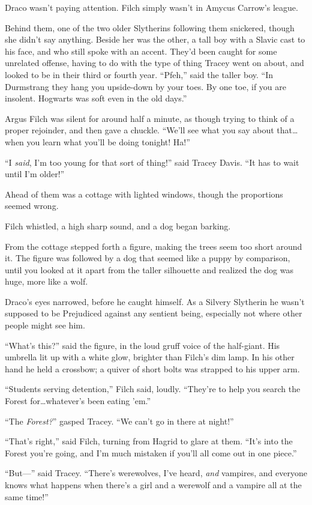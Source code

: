 Draco wasn’t paying attention. Filch simply wasn’t in Amycus Carrow’s league.

Behind them, one of the two older Slytherins following them snickered, though she didn’t say anything. Beside her was the other, a tall boy with a Slavic cast to his face, and who still spoke with an accent. They’d been caught for some unrelated offense, having to do with the type of thing Tracey went on about, and looked to be in their third or fourth year. “Pfeh,” said the taller boy. “In Durmstrang they hang you upside-down by your toes. By one toe, if you are insolent. Hogwarts was soft even in the old days.”

Argus Filch was silent for around half a minute, as though trying to think of a proper rejoinder, and then gave a chuckle. “We’ll see what you say about that…when you learn what you’ll be doing tonight! Ha!”

“I \emph{said}, I’m too young for that sort of thing!” said Tracey Davis. “It has to wait until I’m older!”

Ahead of them was a cottage with lighted windows, though the proportions seemed wrong.

Filch whistled, a high sharp sound, and a dog began barking.

From the cottage stepped forth a figure, making the trees seem too short around it. The figure was followed by a dog that seemed like a puppy by comparison, until you looked at it apart from the taller silhouette and realized the dog was huge, more like a wolf.

Draco’s eyes narrowed, before he caught himself. As a Silvery Slytherin he wasn’t supposed to be Prejudiced against any sentient being, especially not where other people might see him.

“What’s this?” said the figure, in the loud gruff voice of the half-giant. His umbrella lit up with a white glow, brighter than Filch’s dim lamp. In his other hand he held a crossbow; a quiver of short bolts was strapped to his upper arm.

“Students serving detention,” Filch said, loudly. “They’re to help you search the Forest for…whatever’s been eating ’em.”

“The \emph{Forest?}” gasped Tracey. “We can’t go in there at night!”

“That’s right,” said Filch, turning from Hagrid to glare at them. “It’s into the Forest you’re going, and I’m much mistaken if you’ll all come out in one piece.”

“But—” said Tracey. “There’s werewolves, I’ve heard, \emph{and} vampires, and everyone knows what happens when there’s a girl and a werewolf and a vampire all at the same time!”

